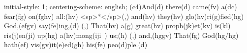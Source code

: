 initial-style: 1;
centering-scheme: english;
(c4)And(d) there(d) came(fv) a(dc) fear(fg) on(fghv) all:(hv) <sp>*</sp>(,) and(hv) they(hv) glo(hv)ri(g)fied(hg) God,(efgv) say(fe)ing,(d) (,) That(hv) a(g) great(hv) proph(jk)et(kv) is(kl) ris(j)en(ji) up(hg) a(hv)mong(iji~) us;(h) (,) and,(hggv) That(fg) God(hg/hg) hath(ef) vis(gv)it(e)ed(gh) his(fe) peo(d)ple.(d)

